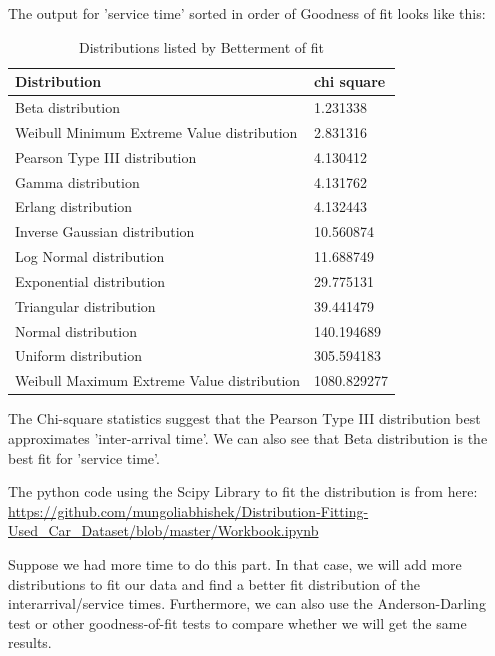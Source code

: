 \documentclass{article}
\begin{document}
The output for 'service time' sorted in order of Goodness of fit looks like this:\newline

\begin{table}[h!]
    \centering
    \caption{Distributions listed by Betterment of fit}
    \begin{tabu}{*{2}{X[c]}}
        \toprule
        \textbf{Distribution} & \textbf{chi square}\\
        \midrule
        Beta distribution & 1.231338\\
        Weibull Minimum Extreme Value distribution & 2.831316\\
        Pearson Type III distribution & 4.130412\\
        Gamma distribution & 4.131762\\
        Erlang distribution & 4.132443\\
        Inverse Gaussian distribution & 10.560874\\
        Log Normal distribution & 11.688749\\
        Exponential distribution & 29.775131\\
        Triangular distribution & 39.441479\\
        Normal distribution & 140.194689\\
        Uniform distribution & 305.594183\\
        Weibull Maximum Extreme Value distribution & 1080.829277\\
        \bottomrule
    \end{tabu}
    \label{tab:Service Best Fit}
\end{table}

The Chi-square statistics suggest that the Pearson Type III distribution best approximates 'inter-arrival time'. We can also see that Beta distribution is the best fit for 'service time'.\newline

The python code using the Scipy Library to fit the distribution is from here:
\url{https://github.com/mungoliabhishek/Distribution-Fitting-Used_Car_Dataset/blob/master/Workbook.ipynb}\newline

Suppose we had more time to do this part. In that case, we will add more distributions to fit our data and find a better fit distribution of the interarrival/service times. Furthermore, we can also use the Anderson-Darling test or other goodness-of-fit tests to compare whether we will get the same results.
\end{document}
